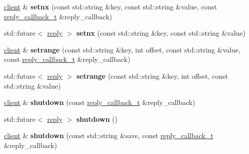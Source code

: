 \begin{DoxyCompactItemize}
\mbox{\label{classcpp__redis_1_1client_ad701f8b9e3769986b1af97049b52de83}} 
\hyperlink{classcpp__redis_1_1client}{client} \& {\bfseries setnx} (const std\+::string \&key, const std\+::string \&value, const \hyperlink{classcpp__redis_1_1client_a061a1140d36d2eaeda82b09a0bb3f9f2}{reply\+\_\+callback\+\_\+t} \&reply\+\_\+callback)
\item 
\mbox{\label{classcpp__redis_1_1client_a1ab0db92e48716812e4b30b268ce29ea}} 
std\+::future$<$ \hyperlink{classcpp__redis_1_1reply}{reply} $>$ {\bfseries setnx} (const std\+::string \&key, const std\+::string \&value)
\item 
\mbox{\label{classcpp__redis_1_1client_a3c1a2d69d9473de409f9102b61496f47}} 
\hyperlink{classcpp__redis_1_1client}{client} \& {\bfseries setrange} (const std\+::string \&key, int offset, const std\+::string \&value, const \hyperlink{classcpp__redis_1_1client_a061a1140d36d2eaeda82b09a0bb3f9f2}{reply\+\_\+callback\+\_\+t} \&reply\+\_\+callback)
\item 
\mbox{\label{classcpp__redis_1_1client_a628f79b8f8e424cdd4b70c076c21338a}} 
std\+::future$<$ \hyperlink{classcpp__redis_1_1reply}{reply} $>$ {\bfseries setrange} (const std\+::string \&key, int offset, const std\+::string \&value)
\item 
\mbox{\label{classcpp__redis_1_1client_acdb7064ddc309b1dbc6681ae559cc189}} 
\hyperlink{classcpp__redis_1_1client}{client} \& {\bfseries shutdown} (const \hyperlink{classcpp__redis_1_1client_a061a1140d36d2eaeda82b09a0bb3f9f2}{reply\+\_\+callback\+\_\+t} \&reply\+\_\+callback)
\item 
\mbox{\label{classcpp__redis_1_1client_ae457a1b446eff2e264452eb35de72d37}} 
std\+::future$<$ \hyperlink{classcpp__redis_1_1reply}{reply} $>$ {\bfseries shutdown} ()
\item 
\mbox{\label{classcpp__redis_1_1client_aca186e9b705a566203a47e8b29f99a28}} 
\hyperlink{classcpp__redis_1_1client}{client} \& {\bfseries shutdown} (const std\+::string \&save, const \hyperlink{classcpp__redis_1_1client_a061a1140d36d2eaeda82b09a0bb3f9f2}{reply\+\_\+callback\+\_\+t} \&reply\+\_\+callback)

\end{DoxyCompactItemize}
